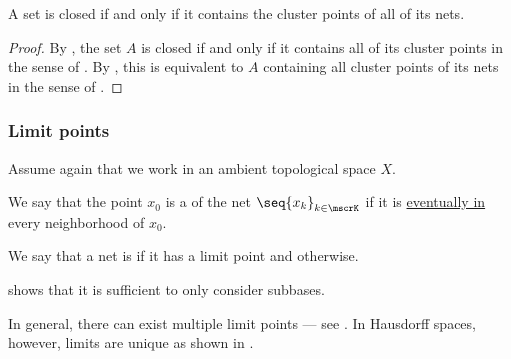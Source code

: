 \begin{corollary}\label{thm:closed_iff_contains_all_net_cluster_points}
  A set is closed if and only if it contains the cluster points of all of its nets.
\end{corollary}
\begin{proof}
  By , the set \( A \) is closed if and only if it contains all of its cluster points in the sense of . By , this is equivalent to \( A \) containing all cluster points of its nets in the sense of .
\end{proof}

\subsubsection{Limit points}

Assume again that we work in an ambient topological space \( X \).

\begin{definition}\label{def:net_limit_point}
  We say that the point \( x_0 \) is a  of the net \( \seq{ x_k }_{k \in \mscrK} \) if it is \hyperref[def:net_eventually_in]{eventually in} every neighborhood of \( x_0 \).

  We say that a net is  if it has a limit point and  otherwise.
\end{definition}
\begin{comments}
  \item {} shows that it is sufficient to only consider subbases.

  \item In general, there can exist multiple limit points --- see . In Hausdorff spaces, however, limits are unique as shown in .
\end{comments}

